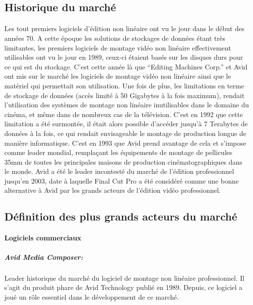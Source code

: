 \subsection {Historique du marché}

\paragraph{}

Les tout premiers logiciels d'édition non linéaire ont vu le jour dans
le début des années 70.  A cette époque les solutions de stockages
de données étant très limitantes, les premiers logiciels de montage
vidéo non linéaire effectivement utilisables ont vu le jour en
1989, ceux-ci étaient basés sur les disques durs pour ce qui est du
stockage. C'est cette année là que ``Editing Machines Corp.'' et Avid
ont mis sur le marché les logiciels de montage vidéo non linéaire
ainsi que le matériel qui permettait son utilisation. Une fois de plus,
les limitations en terme de stockage de données (accès limité à
50 Gigabytes à la fois maximum), rendait l'utilisation des systèmes
de montage non linéaire inutilisables dans le domaine du cinéma,
et même dans de nombreux cas de la télévision. C'est en 1992 que
cette limitation a été surmontée, il était alors possible d'accéder
jusqu'à 7 Terabytes de données à la fois, ce qui rendait envisageable
le montage de production longue de manière informatique. C'est en
1993 que Avid prend avantage de cela et s'impose comme leader mondial,
remplaçant les équipements de montage de pellicules 35mm de toutes
les principales maisons de production cinématographiques dans le
monde. Avid a été le leader incontesté du marché de l'édition
professionnel jusqu'en 2003, date à laquelle Final Cut Pro a été
considéré comme une bonne alternative à Avid par les grands acteurs
de l'édition vidéo professionnel.

\subsection{Définition des plus grands acteurs du marché}

\paragraph {Logiciels commerciaux}

\subparagraph{Avid Media Composer:}

Leader historique du marché du logiciel de montage non linéaire
professionnel. Il s'agit du produit phare de Avid Technology publié
en 1989. Depuis, ce logiciel a joué un rôle essentiel dans le
développement de ce marché.

